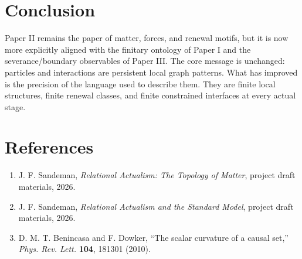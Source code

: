 \documentclass[11pt]{article}
\begin{document}
\section{Conclusion}
Paper II remains the paper of matter, forces, and renewal motifs, but it is now more explicitly aligned with the finitary ontology of Paper I and the severance/boundary observables of Paper III. The core message is unchanged: particles and interactions are persistent local graph patterns. What has improved is the precision of the language used to describe them. They are finite local structures, finite renewal classes, and finite constrained interfaces at every actual stage.

\section*{References}
\begin{enumerate}[leftmargin=1.5em]
\item J. F. Sandeman, \emph{Relational Actualism: The Topology of Matter}, project draft materials, 2026.
\item J. F. Sandeman, \emph{Relational Actualism and the Standard Model}, project draft materials, 2026.
\item D. M. T. Benincasa and F. Dowker, ``The scalar curvature of a causal set,'' \emph{Phys. Rev. Lett.} \textbf{104}, 181301 (2010).
\end{enumerate}
\end{document}
